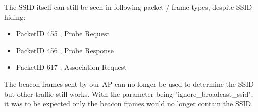 The SSID itself can still be seen in following packet / frame types, despite SSID hiding:
\begin{itemize}
\item PacketID 455  , Probe Request
\item PacketID 456  , Probe Response
\item PacketID 617  , Association Request
\end{itemize}
The beacon frames sent by our AP can no longer be used to determine the SSID but other traffic still works.
With the parameter being "ignore\_broadcast\_ssid", it was to be expected only the beacon frames would no longer contain the SSID.

